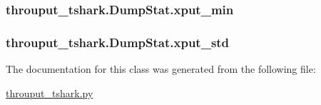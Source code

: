 \hypertarget{classthrouput__tshark_1_1_dump_stat_a353c7d18a6ab1cf675fe48414db842f6}{
\subsubsection[{xput\-\_\-min}]{\setlength{\rightskip}{0pt plus 5cm}throuput\-\_\-tshark.\-Dump\-Stat.\-xput\-\_\-min}}\label{classthrouput__tshark_1_1_dump_stat_a353c7d18a6ab1cf675fe48414db842f6}
\hypertarget{classthrouput__tshark_1_1_dump_stat_a922df400ee818a42eb25ef21d8746241}{
\subsubsection[{xput\-\_\-std}]{\setlength{\rightskip}{0pt plus 5cm}throuput\-\_\-tshark.\-Dump\-Stat.\-xput\-\_\-std}}\label{classthrouput__tshark_1_1_dump_stat_a922df400ee818a42eb25ef21d8746241}


The documentation for this class was generated from the following file\-:\begin{DoxyCompactItemize}
\item 
\hyperlink{throuput__tshark_8py}{throuput\-\_\-tshark.\-py}\end{DoxyCompactItemize}
